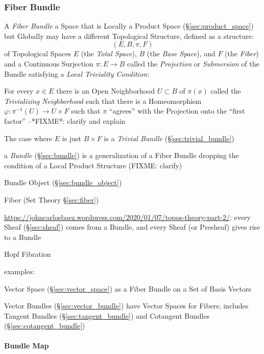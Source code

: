 \subsubsection{Fiber Bundle}\label{sec:fiber_bundle}

A \emph{Fiber Bundle} a Space that is Locally a Product Space
(\S\ref{sec:product_space}) but Globally may have a different Topological
Structure, defined as a structure:
\[
  (E, B, \pi, F)
\]
of Topological Spaces $E$ (the \emph{Total Space}), $B$ (the \emph{Base
  Space}), and $F$ (the \emph{Fiber}) and a Continuous Surjection $\pi : E
\rightarrow B$ called the \emph{Projection} or \emph{Submersion} of the Bundle
satisfying a \emph{Local Triviality Condition}:

For every $x \in E$ there is an Open Neighborhood $U \subset B$ of $\pi(x)$
called the \emph{Trivializing Neighborhood} such that there is a Homeomorphism
$\varphi : \pi^{-1}(U) \rightarrow U \times F$ such that $\pi$ ``agrees'' with
the Projection onto the ``first factor'' --*FIXME*: clarify and explain

The case where $E$ is just $B \times F$ is a \emph{Trivial Bundle}
(\S\ref{sec:trivial_bundle})

\fist a \emph{Bundle} (\S\ref{sec:bundle}) is a generalization of a Fiber Bundle
dropping the condition of a Local Product Structure (FIXME: clarify)

\fist Bundle Object (\S\ref{sec:bundle_object})

\fist Fiber (Set Theory \S\ref{sec:fiber})

\url{https://johncarlosbaez.wordpress.com/2020/01/07/topos-theory-part-2/}:
every Sheaf (\S\ref{sec:sheaf}) comes from a Bundle, and every Sheaf (or
Presheaf) gives rise to a Bundle

Hopf Fibration

examples:

Vector Space (\S\ref{sec:vector_space}) as a Fiber Bundle on a Set of Basis
Vectors

Vector Bundles (\S\ref{sec:vector_bundle}) have Vector Spaces for Fibers;
includes Tangent Bundles (\S\ref{sec:tangent_bundle}) and Cotangent Bundles
(\S\ref{sec:cotangent_bundle})




\paragraph{Bundle Map}\label{sec:bundle_map}\hfill

